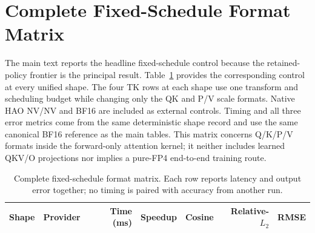 \section{Complete Fixed-Schedule Format Matrix}
\label{app:format-matrix}

The main text reports the headline fixed-schedule control because the
retained-policy frontier is the principal result. Table~\ref{tab:all-formats}
provides the corresponding control at every unified shape. The four TK rows
at each shape use one transform and scheduling budget while changing only the
QK and P/V scale formats. Native HAO NV/NV and BF16 are included as external
controls. Timing and all three error metrics come from the same deterministic
shape record and use the same canonical BF16 reference as the main tables.
This matrix concerns Q/K/P/V formats inside the forward-only attention kernel;
it neither includes learned QKV/O projections nor implies a pure-FP4
end-to-end training route.

\begin{table}[htbp]
\centering
\caption{Complete fixed-schedule format matrix. Each row reports latency and output
error together; no timing is paired with accuracy from another run.}
\label{tab:all-formats}
\scriptsize
\begin{tabular}{llrrrrr}
\toprule
Shape & Provider & Time (ms) & Speedup & Cosine & Relative-$L_2$ & RMSE \\
\midrule
%
\end{tabular}
\end{table}
\FloatBarrier
